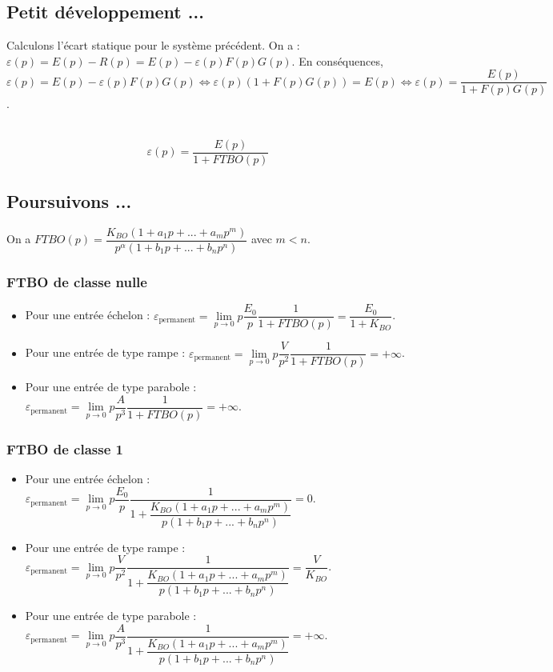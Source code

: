 \documentclass[10pt,fleqn]{article} %
\begin{document}
\subsection*{Petit développement ...}

Calculons l'écart statique pour le système précédent. On a : $\varepsilon(p)=E(p)-R(p)=E(p)-\varepsilon(p) F(p) G(p)$. En conséquences,
$\varepsilon(p)=E(p)-\varepsilon(p) F(p) G(p) 
\Longleftrightarrow \varepsilon(p)\left( 1+F(p) G(p) \right) =E(p) 
\Longleftrightarrow   \varepsilon(p) =\dfrac{E(p)}{1+F(p) G(p)}$.

\begin{resultat} ~\\

$$\varepsilon(p) =\dfrac{E(p)}{1+FTBO(p)}$$
\end{resultat}


\subsection*{Poursuivons ...}
On a $FTBO(p)=\dfrac{K_{BO}\left(1+a_1p+...+a_mp^m \right)}{p^{\alpha}\left(1+b_1p+...+b_np^n\right)}$ avec $m< n$.
\subsubsection*{FTBO de classe nulle}

\begin{itemize}
\item Pour une entrée échelon : 
$\varepsilon_{\text{permanent}}=\lim\limits_{p\to 0} p\dfrac{E_0}{p}\dfrac{1}{1+FTBO(p)} 
= \dfrac{E_0}{1+K_{BO}}$.
\item Pour une entrée de type rampe : 
$\varepsilon_{\text{permanent}}=\lim\limits_{p\to 0} p\dfrac{V}{p^2}\dfrac{1}{1+FTBO(p)} 
=+\infty$.
\item Pour une entrée de type parabole : 
$\varepsilon_{\text{permanent}}=\lim\limits_{p\to 0} p\dfrac{A}{p^3}\dfrac{1}{1+FTBO(p)} 
=+\infty$.
\end{itemize}

\subsubsection*{FTBO de classe 1}

\begin{itemize}
\item Pour une entrée échelon : 
$\varepsilon_{\text{permanent}}=\lim\limits_{p\to 0} p\dfrac{E_0}{p}\dfrac{1}{1+\dfrac{K_{BO}\left(1+a_1p+...+a_mp^m \right)}{p\left(1+b_1p+...+b_np^n\right)}} 
= 0$.
\item Pour une entrée de type rampe : 
$\varepsilon_{\text{permanent}}=\lim\limits_{p\to 0} p\dfrac{V}{p^2}\dfrac{1}{1+\dfrac{K_{BO}\left(1+a_1p+...+a_mp^m \right)}{p\left(1+b_1p+...+b_np^n\right)}} 
=\dfrac{V}{K_{BO}}$.
\item Pour une entrée de type parabole : 
$\varepsilon_{\text{permanent}}=\lim\limits_{p\to 0} p\dfrac{A}{p^3}\dfrac{1}{1+\dfrac{K_{BO}\left(1+a_1p+...+a_mp^m \right)}{p\left(1+b_1p+...+b_np^n\right)}} 
=+\infty$.
\end{itemize}
\end{document}
